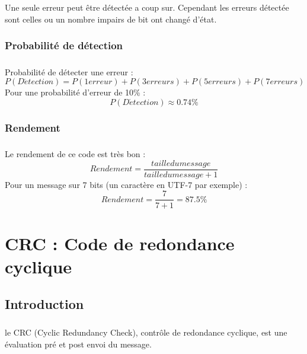 \documentclass[a4paper,10pt]{report}
\begin{document}
                    \paragraph{}
                        Une seule erreur peut être détectée a coup sur.
                        Cependant les erreurs détectée sont celles ou un nombre impairs de bit ont changé d'état.
                \subsection{Probabilité de détection}
                    \paragraph{}
                        Probabilité de détecter une erreur :
                        \[  P(D\acute{e}tection) = P(1 erreur) + P(3 erreurs) + P(5 erreurs) + P(7 erreurs) \]
                        Pour une probabilité d'erreur de 10\% :
                        \[  P(D\acute{e}tection) \approx 0.74\% \]
                \subsection{Rendement}
                    \paragraph{}
                        Le rendement de ce code est très bon :
                        \[  Rendement = \frac{taille du message}{taille du message+1} \]
                        Pour un message sur 7 bits (un caractère en UTF-7 par exemple) :
                        \[  Rendement = \frac{7}{7+1} = 87.5\% \]


        \chapter{CRC : Code de redondance cyclique}
            \section{Introduction}
                \paragraph{}
                    le CRC (Cyclic Redundancy Check), contrôle de redondance cyclique,
                    est une évaluation pré et post envoi du message.
            \newpage
\end{document}
